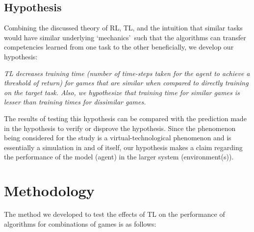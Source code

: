 \subsection*{Hypothesis}
Combining the discussed theory of RL, TL, and the intuition that similar tasks would have similar underlying \lq mechanics\rq \ such that the algorithms can transfer competencies learned from one task to the other beneficially, we develop our hypothesis:

\textit{TL decreases training time (number of time-steps taken for the agent to achieve a threshold of return) for games that are similar when compared to directly training on the target task. Also, we hypothesize that training time for similar games is lesser than training times for dissimilar games.}

The results of testing this hypothesis can be compared with the prediction made in the hypothesis to verify or disprove the hypothesis. Since the phenomenon being considered for the study is a virtual-technological phenomenon and is essentially a simulation in and of itself, our hypothesis makes a claim regarding the performance of the model (agent) in the larger system (environment(s)). 

\section{Methodology}
The method we developed to test the effects of TL on the performance of algorithms for combinations of games is as follows:

